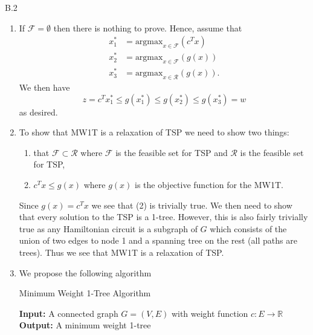 \documentclass[a4paper]{article}
\begin{document}
  \begin{exercise}{B.2}
    \begin{enumerate}[label=(\roman*)]
      \item If $ \mathscr{F} = \emptyset $ then there is nothing to prove. Hence, assume that
        \begin{align*}
          x_1^{*} &= \text{argmax}_{x \in \mathscr{F}}(c^{T}x) \\
          x_2^{*} &= \text{argmax}_{x \in \mathscr{F}}(g(x)) \\
          x_3^{*} &= \text{argmax}_{x \in \mathscr{R}}(g(x))
        .\end{align*}
        We then have
        \begin{equation*}
          z = c^{T}x_1^{*} \leq g(x_1^{*}) \leq  g(x_2^{*}) \leq g(x_3^{*}) = w
        \end{equation*}
        as desired.

      \item To show that MW1T is a relaxation of TSP we need to show two things:
        \begin{enumerate}[label=(\arabic*)]
          \item that $ \mathscr{F} \subset \mathscr{R} $ where $ \mathscr{F} $ is the feasible set for TSP and $ \mathscr{R} $ is the feasible set for TSP,
          \item $ c^{T}x \leq g(x) $ where $ g(x) $ is the objective function for the MW1T.
        \end{enumerate}
        Since $ g(x) = c^{T}x $ we see that (2) is trivially true. We then need to show that every solution to the TSP is a 1-tree. However, this is also fairly trivially true as any Hamiltonian circuit is a subgraph of $ G $ which consists of the union of two edges to node 1 and a spanning tree on the rest (all paths are trees). Thus we see that MW1T is a relaxation of TSP.

      \item We propose the following algorithm
        \begin{algorithm}
          \caption{Minimum Weight 1-Tree Algorithm}
          \begin{algorithmic}[1]
            \State \textbf{Input:} A connected graph $G = (V, E)$ with weight function $c: E \rightarrow \mathbb{R}$
            \State \textbf{Output:} A minimum weight 1-tree


\end{algorithmic}
\end{algorithm}
\end{enumerate}
\end{exercise}
\end{document}
